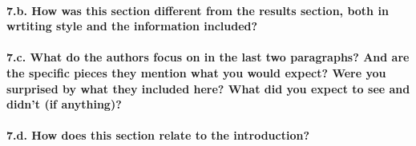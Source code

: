 \documentclass[]{article}
\let\oldparagraph\paragraph
\renewcommand{\paragraph}[1]{\oldparagraph{#1}\mbox{}}
\begin{document}
\hypertarget{b.-how-was-this-section-different-from-the-results-section-both-in-wrtiting-style-and-the-information-included}{%
\paragraph{7.b. How was this section different from the results section,
both in wrtiting style and the information
included?}\label{b.-how-was-this-section-different-from-the-results-section-both-in-wrtiting-style-and-the-information-included}}

\hypertarget{c.-what-do-the-authors-focus-on-in-the-last-two-paragraphs-and-are-the-specific-pieces-they-mention-what-you-would-expect-were-you-surprised-by-what-they-included-here-what-did-you-expect-to-see-and-didnt-if-anything}{%
\paragraph{7.c. What do the authors focus on in the last two paragraphs?
And are the specific pieces they mention what you would expect? Were you
surprised by what they included here? What did you expect to see and
didn't (if
anything)?}\label{c.-what-do-the-authors-focus-on-in-the-last-two-paragraphs-and-are-the-specific-pieces-they-mention-what-you-would-expect-were-you-surprised-by-what-they-included-here-what-did-you-expect-to-see-and-didnt-if-anything}}

\hypertarget{d.-how-does-this-section-relate-to-the-introduction}{%
\paragraph{7.d. How does this section relate to the
introduction?}\label{d.-how-does-this-section-relate-to-the-introduction}}
\end{document}
